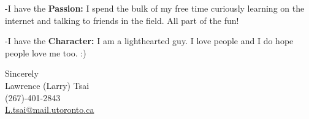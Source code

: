 \documentclass[11pt,a4]{article}
\newcommand{\bold}[1]{ {\bfseries #1}}
\begin{document}
-I have the \bold{Passion:} I spend the bulk of my free time curiously learning 
on the internet and talking to friends in the field. All part of the fun!\par
-I have the \bold{Character:} I am a lighthearted guy. I love people and I do 
hope people love me too. :)




\vspace{0.5cm}
\raggedright
Sincerely \\ Lawrence (Larry) Tsai \\ (267)-401-2843 \\ \href{mailto:L.tsai@mail.utoronto.ca}{L.tsai@mail.utoronto.ca}
\end{document}
